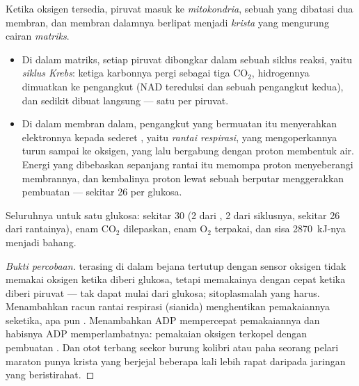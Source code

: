 \begin{proposition}\label{prop:g12:respiration-fermentation:mitochondrion}
Ketika oksigen tersedia, piruvat masuk ke \emph{mitokondria},
sebuah  yang dibatasi dua membran, dan membran dalamnya berlipat
menjadi \emph{krista} yang mengurung cairan \emph{matriks}.
\begin{itemize}
  \item Di dalam matriks, setiap piruvat dibongkar dalam sebuah siklus
        reaksi, yaitu \emph{siklus Krebs}: ketiga
        karbonnya pergi sebagai tiga $\mathrm{CO_2}$, hidrogennya
        dimuatkan ke pengangkut (NAD tereduksi dan sebuah pengangkut
        kedua), dan sedikit  dibuat langsung --- satu per piruvat.
  \item Di dalam membran dalam, pengangkut yang bermuatan itu
        menyerahkan elektronnya kepada sederet , yaitu
        \emph{rantai respirasi}, yang mengoperkannya turun sampai ke
        oksigen, yang lalu bergabung dengan proton membentuk air.
        Energi yang dibebaskan sepanjang rantai itu memompa proton
        menyeberangi membrannya, dan kembalinya proton lewat sebuah
         berputar menggerakkan pembuatan  --- sekitar 26 per
        glukosa.
\end{itemize}
Seluruhnya untuk satu glukosa: sekitar 30  (2 dari , 2
dari siklusnya, sekitar 26 dari rantainya), enam $\mathrm{CO_2}$
dilepaskan, enam $\mathrm{O_2}$ terpakai, dan sisa \qty{2870}{kJ}-nya
menjadi bahang.
\end{proposition}
\begin{proof}[Bukti percobaan]
 terasing di dalam bejana tertutup dengan sensor oksigen
tidak memakai oksigen ketika diberi glukosa, tetapi memakainya dengan
cepat ketika diberi piruvat ---  tak dapat mulai dari
glukosa; sitoplasmalah yang harus. Menambahkan racun rantai respirasi
(sianida) menghentikan pemakaiannya seketika, apa pun .
Menambahkan ADP mempercepat pemakaiannya dan habisnya ADP
memperlambatnya: pemakaian oksigen terkopel dengan pembuatan . Dan
 otot terbang seekor burung kolibri atau paha seorang pelari
maraton punya krista yang berjejal beberapa kali lebih rapat daripada
 jaringan yang beristirahat.
\end{proof}

